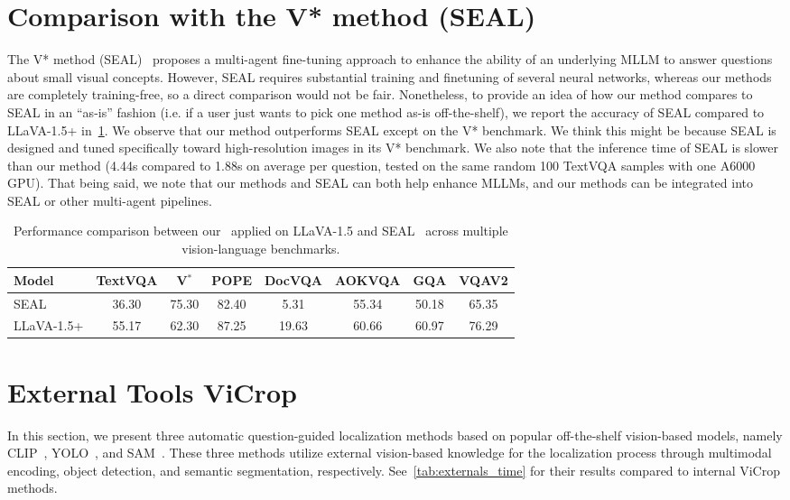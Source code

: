 \section{Comparison with the V* method (SEAL)}
\label{app:seal}
The V* method (SEAL)~\citep{v-star} proposes a multi-agent fine-tuning approach to enhance the ability of an underlying MLLM to answer questions about small visual concepts.
However, SEAL requires substantial training and finetuning of several neural networks, whereas our methods are completely training-free, so a direct comparison would not be fair. Nonetheless, to provide an idea of how our method compares to SEAL in an “as-is” fashion (i.e. if a user just wants to pick one method as-is off-the-shelf), we report the accuracy of SEAL compared to LLaVA-1.5+\rel{} in~\cref{tab:seal_comparison}. We observe that our method outperforms SEAL except on the V* benchmark. We think this might be because SEAL is designed and tuned specifically toward high-resolution images in its V* benchmark. We also note that the inference time of SEAL is slower than our method (4.44s compared to 1.88s on average per question, tested on the same random 100 TextVQA samples with one A6000 GPU).
That being said, we note that our methods and SEAL can both help enhance MLLMs, and our methods can be integrated into SEAL or other multi-agent pipelines.

\begin{table}[h] 
\small
\caption{Performance comparison between our~\rel{} applied on LLaVA-1.5 and SEAL~\citep{v-star} across multiple vision-language benchmarks.} 
\centering 
\begin{tabular}{lccccccc} 
\toprule Model & TextVQA & V$^*$ & POPE & DocVQA & AOKVQA & GQA & VQAV2 \\
\midrule SEAL  & 36.30 & 75.30 & 82.40 & 5.31 & 55.34 & 50.18 & 65.35 \\
LLaVA-1.5+\rel{}  & 55.17 & 62.30 & 87.25 & 19.63 & 60.66 & 60.97 & 76.29 \\
\bottomrule 
\end{tabular} 
\label{tab:seal_comparison} 
\end{table}

\section{External Tools ViCrop}
\label{app:external}

In this section, we present three automatic question-guided localization methods based on popular off-the-shelf vision-based models, namely CLIP~\cite{clip}, YOLO~\cite{yolo}, and SAM~\cite{kirillov2023segment}. These three methods utilize external vision-based knowledge for the localization process through multimodal encoding, object detection, and semantic segmentation, respectively. See~\cref{tab:externals_time} for their results compared to internal ViCrop methods.


